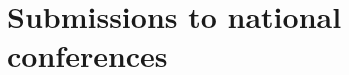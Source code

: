 \section*{Submissions to national conferences}
\begin{refsection}
\nocite{adina_s_wagner_2021_4541323}

\begin{refcontext}[sorting=nyt]  
	\printbibliography[heading=none, resetnumbers=true]
\end{refcontext}





\end{refsection}
%
